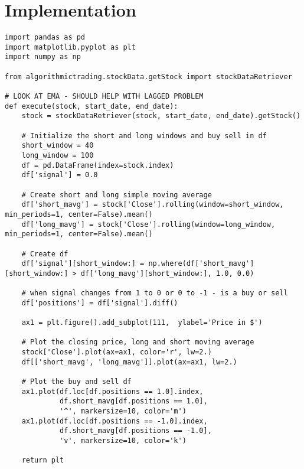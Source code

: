 \documentclass[letterpaper,11pt]{article}
\begin{document}
\section*{Implementation}
\begin{verbatim}
import pandas as pd
import matplotlib.pyplot as plt
import numpy as np

from algorithmictrading.stockData.getStock import stockDataRetriever

# LOOK AT EMA - SHOULD HELP WITH LAGGED PROBLEM
def execute(stock, start_date, end_date):
    stock = stockDataRetriever(stock, start_date, end_date).getStock()

    # Initialize the short and long windows and buy sell in df
    short_window = 40
    long_window = 100
    df = pd.DataFrame(index=stock.index)
    df['signal'] = 0.0

    # Create short and long simple moving average
    df['short_mavg'] = stock['Close'].rolling(window=short_window, min_periods=1, center=False).mean()
    df['long_mavg'] = stock['Close'].rolling(window=long_window, min_periods=1, center=False).mean()

    # Create df
    df['signal'][short_window:] = np.where(df['short_mavg'][short_window:] > df['long_mavg'][short_window:], 1.0, 0.0) 

    # when signal changes from 1 to 0 or 0 to -1 - is a buy or sell
    df['positions'] = df['signal'].diff()

    ax1 = plt.figure().add_subplot(111,  ylabel='Price in $')

    # Plot the closing price, long and short moving average
    stock['Close'].plot(ax=ax1, color='r', lw=2.)
    df[['short_mavg', 'long_mavg']].plot(ax=ax1, lw=2.)

    # Plot the buy and sell df
    ax1.plot(df.loc[df.positions == 1.0].index,
             df.short_mavg[df.positions == 1.0],
             '^', markersize=10, color='m')
    ax1.plot(df.loc[df.positions == -1.0].index,
             df.short_mavg[df.positions == -1.0],
             'v', markersize=10, color='k')

    return plt

\end{verbatim}



\end{document}
